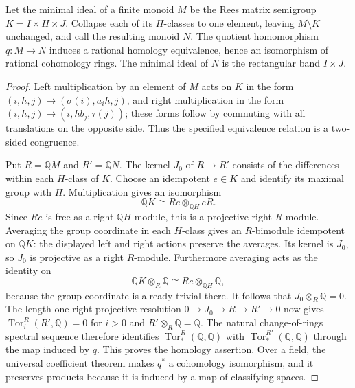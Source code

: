 \begin{lemma}\label{lem:B-collapse-minimal-group}
Let the minimal ideal of a finite monoid $M$ be the Rees matrix
semigroup $K=I\times H\times J$.  Collapse each of its $H$-classes
to one element, leaving $M\setminus K$ unchanged, and call the resulting
monoid $N$.  The quotient homomorphism $q:M\to N$ induces a rational
homology equivalence, hence an isomorphism of rational cohomology rings.
The minimal ideal of $N$ is the rectangular band $I\times J$.
\end{lemma}
\begin{proof}
Left multiplication by an element of $M$ acts on $K$ in the form
$(i,h,j)\mapsto(\sigma(i),a_i h,j)$, and right multiplication
in the form $(i,h,j)\mapsto(i,hb_j,\tau(j))$; these forms follow
by commuting with all translations on the opposite side.  Thus the
specified equivalence relation is a two-sided congruence.

Put $R=\mathbb QM$ and $R'=\mathbb QN$.  The kernel $J_0$ of
$R\to R'$ consists of the differences within each $H$-class of $K$.
Choose an idempotent $e\in K$ and identify its maximal group with $H$.
Multiplication gives an isomorphism
\[
 \mathbb QK\cong Re\otimes_{\mathbb QH}eR.
\]
Since $Re$ is free as a right $\mathbb QH$-module, this is a
projective right $R$-module.  Averaging the group coordinate in each
$H$-class gives an $R$-bimodule idempotent on $\mathbb QK$:
the displayed left and right actions preserve the averages.
Its kernel is $J_0$, so $J_0$ is projective as a right $R$-module.
Furthermore averaging acts as the identity on
\[
 \mathbb QK\otimes_R\mathbb Q
 \cong Re\otimes_{\mathbb QH}\mathbb Q,
\]
because the group coordinate is already trivial there.  It follows
that $J_0\otimes_R\mathbb Q=0$.
The length-one right-projective resolution
$0\to J_0\to R\to R'\to0$ now gives
$\operatorname{Tor}^R_i(R',\mathbb Q)=0$ for $i>0$ and
$R'\otimes_R\mathbb Q=\mathbb Q$.
The natural change-of-rings spectral sequence therefore identifies
$\operatorname{Tor}^R_*(\mathbb Q,\mathbb Q)$ with
$\operatorname{Tor}^{R'}_*(\mathbb Q,\mathbb Q)$ through the map
induced by $q$.  This proves the homology assertion.  Over a field,
the universal coefficient theorem makes $q^*$ a cohomology
isomorphism, and it preserves products because it is induced by a map
of classifying spaces.
\end{proof}

